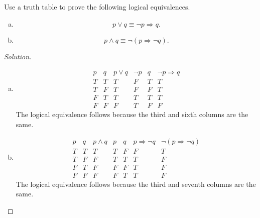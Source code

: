 \documentclass[12pt]{amsart}
\begin{document}
\begin{thm}[10 Points]\label{ex9}
  Use a truth table to prove the following logical equivalences.
  \begin{enumerate}[(a)]
  \item
    $$p \vee q \equiv \neg p \Rightarrow q.$$
  \item
    $$p \wedge q \equiv \neg\left(p \Rightarrow \neg q\right).$$
  \end{enumerate}
  \begin{proof}[Solution]
    \begin{enumerate}[(a)]
    \item
      $$\begin{array}{c|c|c|c|c|c}
        p & q & p \vee q & \neg p & q & \neg p \Rightarrow q\\
        \hline
        T & T & T & F & T & T\\
        T & F & T & F & F & T\\
        F & T & T & T & T & T\\
        F & F & F & T & F & F
        \end{array}$$
      The logical equivalence follows because the third and sixth columns are the same.
      \item
        $$\begin{array}{c|c|c|c|c|c|c}
        p & q & p \wedge q & p & q & p \Rightarrow \neg q & \neg(p \Rightarrow \neg q)\\
        \hline
        T & T & T & T & F & F & T\\
        T & F & F & T & T & T & F\\
        F & T & F & F & F & T & F\\
        F & F & F & F & T & T & F
      \end{array}$$
        The logical equivalence follows because the third and seventh columns are the same.
    \end{enumerate}
  \end{proof}
\end{thm}
\end{document}
